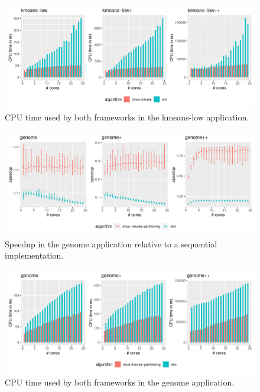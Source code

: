 \begin{figure}
    \centering
    \includegraphics[width=\textwidth,keepaspectratio]{gfx/results/cpu_kmeans-low_comb}
    \caption{CPU time used by both frameworks in the kmeans-low application.}%
    \label{fig:evaluation:kmeans-low-cpu}
\end{figure}

\begin{figure}
    \centering
    \includegraphics[width=\textwidth,keepaspectratio]{gfx/results/genome_comb}
    \caption{Speedup in the genome application relative to a sequential implementation.}%
    \label{fig:evaluation:genome}
\end{figure}

\begin{figure}
    \centering
    \includegraphics[width=\textwidth,keepaspectratio]{gfx/results/cpu_genome_comb}
    \caption{CPU time used by both frameworks in the genome application.}%
    \label{fig:evaluation:genome-cpu}
\end{figure}

